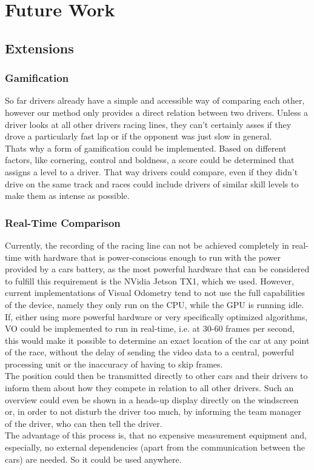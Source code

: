 \section{Future Work}
\label{sec:future_work}

\subsection{Extensions}
\subsubsection{Gamification}
So far drivers already have a simple and accessible way of comparing each other, however our method only provides a direct relation between two drivers. Unless a driver looks at all other drivers racing lines, they can't certainly asses if they drove a particularly fast lap or if the opponent was just slow in general.\\
Thats why a form of gamification could be implemented. Based on different factors, like cornering, control and boldness, a score could be determined that assigns a level to a driver. That way drivers could compare, even if they didn't drive on the same track and races could include drivers of similar skill levels to make them as intense as possible.

\subsubsection{Real-Time Comparison}
Currently, the recording of the racing line can not be achieved completely in real-time with hardware that is power-conscious enough to run with the power provided by a cars battery, as the most powerful hardware that can be considered to fulfill this requirement is the NVidia Jetson TX1, which we used. However, current implementations of Visual Odometry tend to not use the full capabilities of the device, namely they only run on the CPU, while the GPU is running idle. If, either using more powerful hardware or very specifically optimized algorithms, VO could be implemented to run in real-time, i.e. at 30-60 frames per second, this would make it possible to determine an exact location of the car at any point of the race, without the delay of sending the video data to a central, powerful processing unit or the inaccuracy of having to skip frames.\\
The position could then be transmitted directly to other cars and their drivers to inform them about how they compete in relation to all other drivers. Such an overview could even be shown in a heads-up display directly on the windscreen or, in order to not disturb the driver too much, by informing the team manager of the driver, who can then tell the driver.\\
The advantage of this process is, that no expensive measurement equipment and, especially, no external dependencies (apart from the communication between the cars) are needed. So it could be used anywhere.

